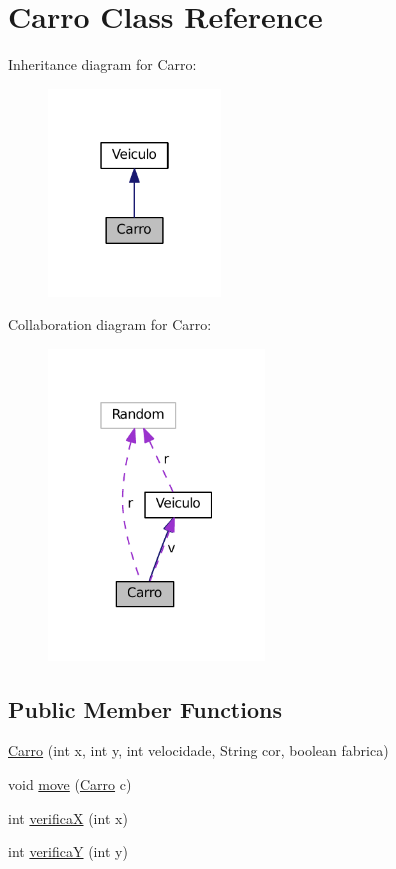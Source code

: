 \hypertarget{classCarro}{}\section{Carro Class Reference}
\label{classCarro}


Inheritance diagram for Carro\+:\nopagebreak
\begin{figure}[H]
\begin{center}
\leavevmode
\includegraphics[width=130pt]{classCarro__inherit__graph}
\end{center}
\end{figure}


Collaboration diagram for Carro\+:\nopagebreak
\begin{figure}[H]
\begin{center}
\leavevmode
\includegraphics[width=163pt]{classCarro__coll__graph}
\end{center}
\end{figure}
\subsection*{Public Member Functions}
\begin{DoxyCompactItemize}
\item 
\hyperlink{classCarro_a66ef0b0e1dbbf15cf165bdd741e7b07d}{Carro} (int x, int y, int velocidade, String cor, boolean fabrica)
\item 
void \hyperlink{classCarro_a17c8959d24c88817f461f1c29e0f99ed}{move} (\hyperlink{classCarro}{Carro} c)
\item 
int \hyperlink{classCarro_add3f779cbff4f49e42bd073eaca2451a}{verificaX} (int x)
\item 
int \hyperlink{classCarro_aefac90e7ced5a09323c9114fc2905dd6}{verificaY} (int y)
\end{DoxyCompactItemize}


